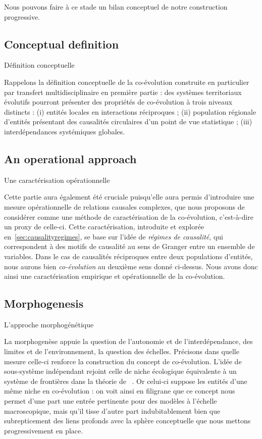 Nous pouvons faire à ce stade un bilan conceptuel de notre construction progressive.


\subsection*{Conceptual definition}{Définition conceptuelle}


Rappelons la définition conceptuelle de la co-évolution construite en particulier par transfert multidisciplinaire en première partie : des systèmes territoriaux évolutifs pourront présenter des propriétés de co-évolution à trois niveaux distincts : (i) entités locales en interactions réciproques ; (ii) population régionale d'entités présentant des causalités circulaires d'un point de vue statistique ; (iii) interdépendances systémiques globales.


\subsection*{An operational approach}{Une caractérisation opérationnelle}


Cette partie aura également été cruciale puisqu'elle aura permis d'introduire une mesure opérationnelle de relations causales complexes, que nous proposons de considérer comme une méthode de caractérisation de la co-évolution, c'est-à-dire un proxy de celle-ci. Cette caractérisation, introduite et explorée en~\ref{sec:causalityregimes}, se base sur l'idée de \emph{régimes de causalité}, qui correspondent à des motifs de causalité au sens de Granger entre un ensemble de variables. Dans le cas de causalités réciproques entre deux populations d'entités, nous aurons bien \emph{co-évolution} au deuxième sens donné ci-dessus. Nous avons donc ainsi une caractérisation empirique et opérationnelle de la co-évolution.



\subsection*{Morphogenesis}{L'approche morphogénétique}


La morphogenèse appuie la question de l'autonomie et de l'interdépendance, des limites et de l'environnement, la question des échelles. Précisons dans quelle mesure celle-ci renforce la construction du concept de co-évolution. L'idée de sous-système indépendant rejoint celle de niche écologique équivalente à un système de frontières dans la théorie de ~\cite{holland2012signals}. Or celui-ci suppose les entités d'une même niche en co-évolution : on voit ainsi en filigrane que ce concept nous permet d'une part une entrée pertinente pour des modèles à l'échelle macroscopique, mais qu'il tisse d'autre part indubitablement bien que subrepticement des liens profonds avec la sphère conceptuelle que nous mettons progressivement en place.




